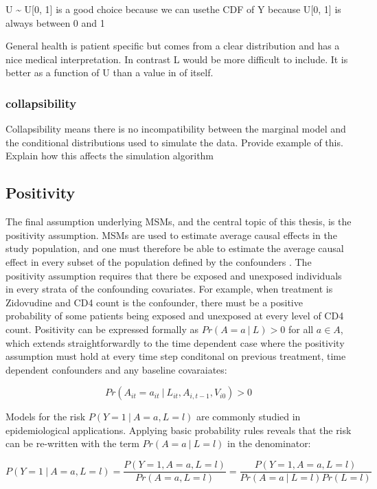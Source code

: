 \documentclass[11pt]{article}
\begin{document}
U \textasciitilde{} U{[}0, 1{]} is a good choice because we can usethe
CDF of Y because U{[}0, 1{]} is always between 0 and 1

General health is patient specific but comes from a clear distribution
and has a nice medical interpretation. In contrast L would be more
difficult to include. It is better as a function of U than a value in of
itself.

\subsubsection{collapsibility}\label{collapsibility}

Collapsibility means there is no incompatibility between the marginal
model and the conditional distributions used to simulate the data.
Provide example of this. Explain how this affects the simulation
algorithm

    \subsection{Positivity}\label{positivity}

The final assumption underlying MSMs, and the central topic of this
thesis, is the positivity assumption. MSMs are used to estimate average
causal effects in the study population, and one must therefore be able
to estimate the average causal effect in every subset of the population
defined by the confounders \citet{Cole2008}. The positivity assumption
requires that there be exposed and unexposed individuals in every strata
of the confounding covariates. For example, when treatment is Zidovudine
and CD4 count is the confounder, there must be a positive probability of
some patients being exposed and unexposed at every level of CD4 count.
Positivity can be expressed formally as \(Pr(A=a\ |\ L) > 0\) for all
\(a \in A\), which extends straightforwardly to the time dependent case
where the positivity assumption must hold at every time step conditonal
on previous treatment, time dependent confounders and any baseline
covaraiates:

\[Pr(A_{it}=a_{it}\ |\ L_{it}, A_{i, t-1}, V_{i0}) > 0\]

Models for the risk \(P(Y=1\ |\ A=a, L=l)\) are commonly studied in
epidemiological applications. Applying basic probability rules reveals
that the risk can be re-written with the term \(Pr(A=a\ |\ L=l)\) in the
denominator:

\[P(Y=1\ |\ A=a, L=l) = \frac{P(Y=1, A=a, L=l)}{Pr(A=a, L=l)} = \frac{P(Y=1, A=a, L=l)}{Pr(A=a\ |\ L=l)Pr(L=l)}\]
\end{document}
